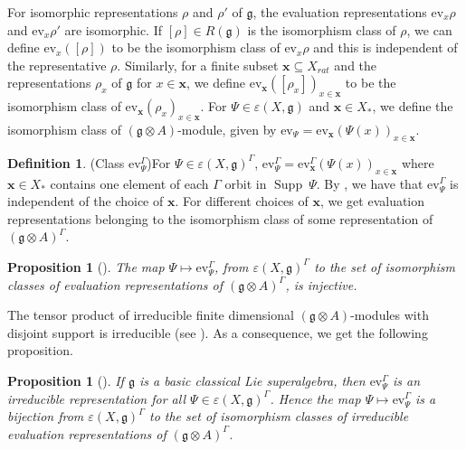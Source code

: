 \documentclass[11pt]{amsart}
\theoremstyle{plain}
\newtheorem{prop}[thm]{Proposition}
\theoremstyle{definition}
\newtheorem{defn}[thm]{Definition}
\newcommand{\g}{\mathfrak{g}}
\DeclareMathOperator{\Supp}{Supp}
\begin{document}
For isomorphic representations $\rho$ and $\rho'$ of $\g$, the evaluation representations $\mbox{ev}_{x}\rho$ and $\mbox{ev}_{x}\rho'$ are isomorphic. If $[\rho]\in R(\g)$ is the isomorphism class of $\rho$, we can define $\mbox{ev}_{x}([\rho])$ to be the isomorphism class of $\mbox{ev}_{x}\rho$ and this is independent of the representative $\rho$. Similarly, for a finite subset $\textbf{x}\subseteq
 X_{rat}$ and the representations $\rho_{x}$ of $\g$ for $x\in\textbf{x}$, we define $\mbox{ev}_{\textbf{x}}([\rho_{x}])_{x\in\textbf{x}}$ to be the isomorphism class of $\mbox{ev}_{\textbf{x}}(\rho_{x})_{x\in\textbf{x}}$. For $\Psi\in\varepsilon(X,\g)$ and $\textbf{x}\in X_{*}$, we define the isomorphism class of $(\g\otimes A)$-module, given by $\mbox{ev}_{\Psi}=\mbox{ev}_{\textbf{x}}(\Psi(x))_{x\in\textbf{x}}$.
\begin{defn}(Class $\mbox{ev}_{\Psi}^{\Gamma}$)\label{def:13}
    For $\Psi\in\varepsilon(X,\g)^{\Gamma}$, $\mbox{ev}_{\Psi}^{\Gamma}=\mbox{ev}_{\mathbf{x}}^{\Gamma}(\Psi(x))_{x\in\mathbf{x}}$ where $\mathbf{x}\in X_{*}$ contains one element of each $\Gamma$ orbit in $\Supp\ \Psi$. By \cite[Lemma 5.9]{Sav14}, we have that $\mbox{ev}_{\Psi}^{\Gamma}$ is independent of the choice of $\mathbf{x}$. For different choices of $\mathbf{x}$, we get evaluation representations belonging to the isomorphism class of some representation of $(\g\otimes A)^{\Gamma}$. 
\end{defn}
\begin{prop}[\cite{Sav14,NeherSavageSenesi2012}]
 The map $\Psi\mapsto\mbox{ev}_{\Psi}^{\Gamma}$, from $\varepsilon(X,\g)^{\Gamma}$ to the set of isomorphism classes of evaluation representations of $(\g\otimes A)^{\Gamma}$, is injective.
\end{prop}
The tensor product of irreducible finite dimensional $(\g\otimes A)$-modules with disjoint support is irreducible (see \cite{Sav14}). As a consequence, we get the following proposition.
\begin{prop}[\cite{Sav14}]
If $\g$ is a basic classical Lie superalgebra, then $\mbox{ev}_{\Psi}^{\Gamma}$ is an irreducible representation for all $\Psi\in\varepsilon(X,\g)^{\Gamma}$. Hence the map $\Psi\mapsto\mbox{ev}_{\Psi}^{\Gamma}$ is a bijection from $\varepsilon(X,\g)^{\Gamma}$ to the set of isomorphism classes of irreducible evaluation representations of $(\g\otimes A)^{\Gamma}$. 
\end{prop}
\end{document}
